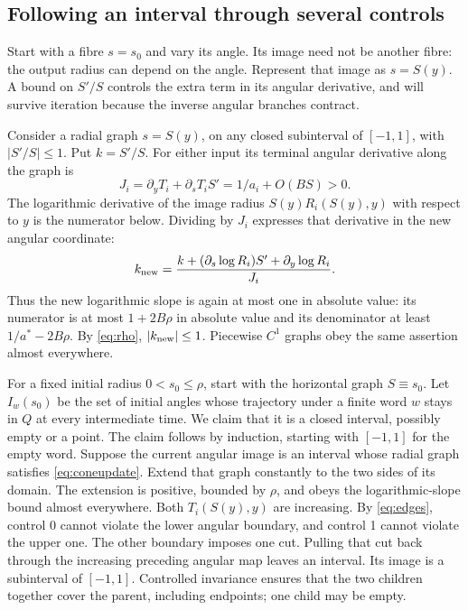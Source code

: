 \documentclass[11pt]{amsart}
\theoremstyle{definition}
\theoremstyle{remark}
\numberwithin{equation}{section}
\begin{document}
\subsection{Following an interval through several controls}
Start with a fibre $s=s_0$ and vary its angle. Its image need
not be another fibre: the output radius can depend on the angle.
Represent that image as $s=S(y)$. A bound on $S'/S$ controls
the extra term in its angular derivative, and will survive
iteration because the inverse angular branches contract.

Consider a radial graph \(s=S(y)\), on any closed subinterval of
\([-1,1]\), with \(|S'/S|\le1\). Put \(k=S'/S\).
For either input its terminal angular derivative along the graph is
\[
 J_i=\partial_yT_i+\partial_sT_i S'
           =1/a_i+O(BS)>0.
\]
The logarithmic derivative of the image radius
$S(y)R_i(S(y),y)$ with respect to $y$ is the numerator below.
Dividing by $J_i$ expresses that derivative in the new angular
coordinate:
\begin{equation}
k_{\rm new}
 =\frac{k+(\partial_s\log R_i)S'+\partial_y\log R_i}{J_i}.
                                                                  \label{eq:coneupdate}
\end{equation}
Thus the new logarithmic slope is again at most one in absolute
value: its numerator is at most \(1+2B\rho\) in absolute value and its
denominator at least \(1/a^*-2B\rho\). By \eqref{eq:rho}, \(|k_{\rm new}|\le1\).
Piecewise \(C^1\) graphs obey the same assertion almost everywhere.

For a fixed initial radius \(0<s_0\le\rho\), start with the horizontal
graph \(S\equiv s_0\). Let \(I_w(s_0)\) be the set of initial angles
whose trajectory under a finite word \(w\) stays in $Q$ at every
intermediate time. We claim that it is a closed interval, possibly empty or a point.
The claim follows by induction, starting with $[-1,1]$ for the
empty word. Suppose the current angular image is an interval
whose radial graph satisfies \eqref{eq:coneupdate}. Extend that graph
constantly to the two sides of its domain. The extension is positive,
bounded by \(\rho\), and obeys the logarithmic-slope bound almost
everywhere. Both \(T_i(S(y),y)\) are increasing. By \eqref{eq:edges}, control 0
cannot violate the lower angular boundary, and control 1 cannot
violate the upper one. The other boundary imposes one cut. Pulling
that cut back through the increasing preceding angular map leaves
an interval. Its image is a subinterval of $[-1,1]$.
Controlled invariance ensures that the two children together cover
the parent, including endpoints; one child may be empty.
\end{document}
